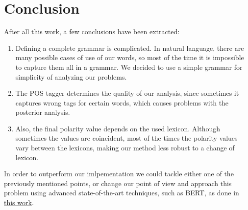 \documentclass[11pt]{article}
\begin{document}
\section{ Conclusion}

After all this work, a few conclusions have been extracted:
\begin{enumerate}
    \item Defining a complete grammar is complicated. In natural language, there are many possible cases of use of our words, so most of the time it is impossible to capture them all in a grammar. We decided to use a simple grammar for simplicity of analyzing our problems.
    \item The POS tagger determines the quality of our analysis, since sometimes it captures wrong tags for certain words, which causes problems with the posterior analysis.
    \item Also, the final polarity value depends on the used lexicon. Although sometimes the values are coincident, most of the times the polarity values vary between the lexicons, making our method less robust to a change of lexicon.
\end{enumerate}

In order to outperform our imlpementation we could tackle either one of the previously mentioned points, or change our point of view and approach this problem using advanced state-of-the-art techniques, such as BERT, as done in \href{https://arxiv.org/abs/2010.11731}{this work}.
\end{document}
